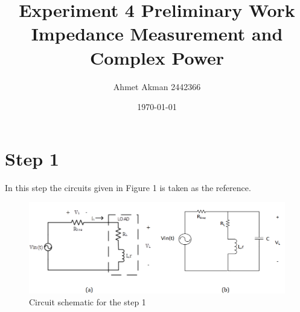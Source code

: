 \documentclass[letterpaper,12pt]{article}
\begin{document}
\title{Experiment 4 Preliminary Work \protect\\ Impedance Measurement and  Complex Power}
\author{Ahmet Akman 2442366 \protect\\}
\date{\today}
\maketitle
\tableofcontents

\section{Step 1}
In this step the circuits given in Figure 1 is taken as the reference.
\begin{figure}[H]
    \centering
    \includegraphics[width=1\textwidth]{1.png}
    \caption{Circuit schematic for the step 1}
\end{figure} 
\end{document}
